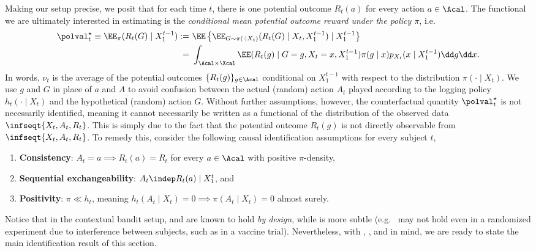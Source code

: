 Making our setup precise, we posit that for each time $t$, there is one potential outcome $R_t(a)$ for every action $a \in \Acal$. The functional we are ultimately interested in estimating is the \emph{conditional mean potential outcome reward under the policy $\pi$}, i.e.
\begin{align}
  \polval_t^\star \equiv \EE_\pi(R_t(G) \mid X_1^{t-1}) :=&\ \EE \left \{ \EE_{G \sim \pi(\cdot \mid X_t)}(R_t(G) \mid X_t, X_1^{t-1}) \mid X_1^{t-1} \right \}\\
  =&\ \int_{\Acal \times \Xcal} \EE(R_t(g) \mid G=g, X_t = x, X_1^{t-1}) \pi(g \mid x) p_{X_t}(x \mid X_1^{t-1}) \dd g \dd x.
\end{align}
In words, $\nu_t$ is the average of the potential outcomes $\{R_t(g)\}_{g \in \Acal}$ conditional on $X_1^{t-1}$ with respect to the distribution $\pi(\cdot \mid X_t)$. We use $g$ and $G$ in place of $a$ and $A$ to avoid confusion between the actual (random) action $A_t$ played according to the logging policy $h_t(\cdot \mid X_t)$ and the hypothetical (random) action $G$.
Without further assumptions, however, the counterfactual quantity $\polval_t^\star$ is not necessarily identified, meaning it cannot necessarily be written as a functional of the distribution of the observed data $\infseqt{X_t, A_t, R_t}$. This is simply due to the fact that the potential outcome $R_t(g)$ is not directly observable from $\infseqt{X_t, A_t, R_t}$. To remedy this, consider the following causal identification assumptions for every subject $t$,
\begin{enumerate}[start=1,label={(\IA{}\arabic*):},align=left]
\item \textbf{Consistency}: $A_t = a \implies R_t(a) = R_t$ for every $a \in \Acal$ with positive $\pi$-density,
\item \textbf{Sequential exchangeability}: $A_t \indep R_t(a) \mid X_1^t$, and
\item \textbf{Positivity}: $\pi \ll h_t$, meaning $h_t(A_t \mid X_t) = 0 \implies \pi(A_t \mid X_t) = 0$ almost surely.
\end{enumerate}
Notice that in the contextual bandit setup,  and  are known to hold \emph{by design}, while  is more subtle (e.g.~ may not hold even in a randomized experiment due to interference between subjects, such as in a vaccine trial). Nevertheless, with , , and  in mind, we are ready to state the main identification result of this section.

